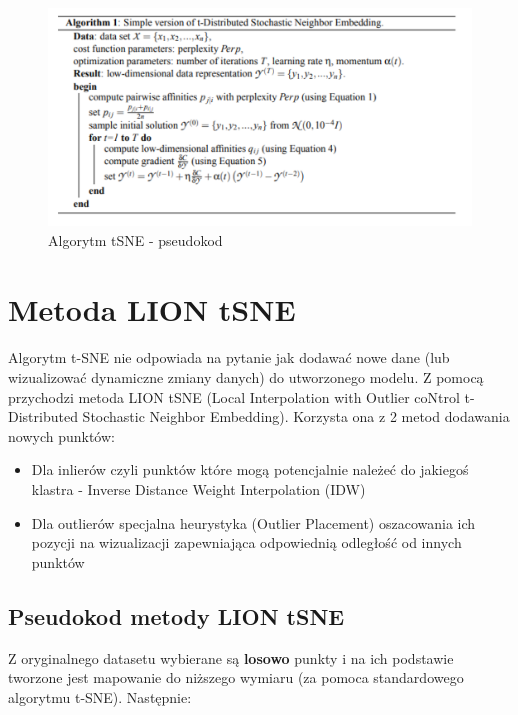 \documentclass{article}
\begin{document}
\begin{figure}[h]
\includegraphics[scale=0.52]{algorithm_TSNE_pseudocode.PNG}
\caption{Algorytm tSNE - pseudokod}
\end{figure}

\section{Metoda LION tSNE}
\label{sec:lionTSNE}
\paragraph{}
Algorytm t-SNE nie odpowiada na pytanie jak dodawać nowe dane (lub wizualizować dynamiczne zmiany danych) do utworzonego modelu. Z pomocą przychodzi metoda     LION tSNE (Local Interpolation with Outlier coNtrol t-Distributed Stochastic Neighbor Embedding). Korzysta ona z 2 metod dodawania nowych punktów: 
\begin{itemize}
    \item Dla inlierów czyli punktów które mogą potencjalnie należeć do jakiegoś klastra - Inverse Distance Weight Interpolation (IDW)
    \item Dla outlierów specjalna heurystyka (Outlier Placement) oszacowania ich pozycji na wizualizacji zapewniająca odpowiednią odległość od innych punktów
\end{itemize}

\subsection{Pseudokod metody LION tSNE}
Z oryginalnego datasetu wybierane są \textbf{losowo} punkty i na ich podstawie tworzone jest mapowanie do niższego wymiaru (za pomoca standardowego algorytmu t-SNE). Następnie:
\end{document}
